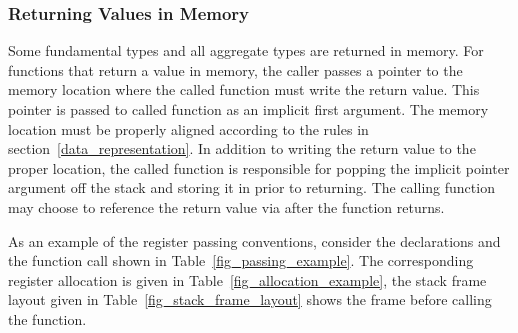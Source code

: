 \subsubsection{Returning Values in Memory}

Some fundamental types and all aggregate types are returned in memory.
For functions that return a value in memory, the caller passes a pointer
to the memory location where the called function must write the return
value. This pointer is passed to called function as an implicit first
argument. The memory location must be properly aligned according to the
rules in section~\ref{data_representation}.  In addition to writing the
return value to the proper location, the called function is responsible
for popping the implicit pointer argument off the stack and storing it in
\EAX prior to returning. The calling function may choose to reference the
return value via \EAX after the function returns.

As an example of the register passing conventions, consider the
declarations and the function call shown in
Table~\ref{fig_passing_example}.  The corresponding register
allocation is given in Table~\ref{fig_allocation_example}, the stack
frame layout given in Table~\ref{fig_stack_frame_layout} shows the frame
before calling the function.

\begin{table}[H]
\Hrule
\caption{Parameter Passing Example}
\label{fig_passing_example}
\begin{center}
\end{center}
\Hrule
\end{table}

